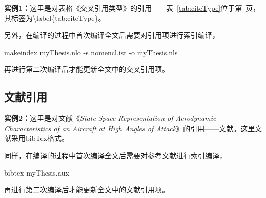 {\bf{实例1：}}这里是对表格《交叉引用类型》的引用——表~\ref{tab:citeType}位于第~\pageref{tab:citeType}页，其标签为\textbackslash label\{tab:citeType\}。

另外，在编译的过程中首次编译全文后需要对引用项进行索引编译，

\begin{center}
  {\color{blue}makeindex myThesis.nlo -s nomencl.ist -o myThesis.nls}
\end{center}

再进行第二次编译后才能更新全文中的交叉引用项。

\subsection{文献引用}
\label{sec:citeRefs}

{\bf{实例2：}}这里是对文献《{\it{State-Space Representation of Aerodynamic Characteristics of an Aircraft at High Angles of Attack}}》的引用——文献\cite{Goman:state_aerodynamics}。这里文献采用bibTex格式。

同样，在编译的过程中首次编译全文后需要对参考文献进行索引编译，

\begin{center}
  {\color{blue}bibtex myThesis.aux}
\end{center}

再进行第二次编译后才能更新全文中的文献引用项。
